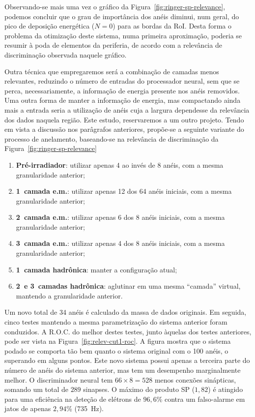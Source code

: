 Observando-se mais uma vez o gráfico da Figura~\ref{fig:ringer-sp-relevance},
podemos concluir que o grau de importância dos anéis diminui, num geral, do
pico de deposição energética ($N = 0$) para as bordas da RoI. Desta forma o
problema da otimização deste sistema, numa primeira aproximação, poderia se
resumir à poda de elementos da periferia, de acordo com a relevância de
discriminação observada naquele gráfico.

Outra técnica que empregaremos será a combinação de camadas menos relevantes,
reduzindo o número de entradas do processador neural, sem que se perca,
necessariamente, a informação de energia presente nos anéis removidos. Uma
outra forma de manter a informação de energia, mas compactando ainda mais a
entrada seria a utilização de anéis cuja a largura dependesse da relevância
dos dados naquela região. Este estudo, reservaremos a um outro projeto. Tendo
em vista a discussão nos parâgrafos anteriores, propõe-se a seguinte variante
do processo de anelamento, baseando-se na relevância de discriminação da
Figura~\ref{fig:ringer-sp-relevance}

\begin{enumerate}
\item \textbf{Pré-irradiador}: utilizar apenas 4 ao invés de 8 anéis, com a
mesma granularidade anterior;
\item \textbf{1\eira\ camada e.m.}: utilizar apenas 12 dos 64 anéis iniciais, com a
mesma granularidade anterior;
\item \textbf{2\eira\ camada e.m.}: utilizar apenas 6 dos 8 anéis iniciais, com a
mesma granularidade anterior;
\item \textbf{3\eira\ camada e.m.}: utilizar apenas 4 dos 8 anéis iniciais, com a
mesma granularidade anterior;
\item \textbf{1\eira\ camada hadrônica}: manter a configuração atual;
\item \textbf{2\eira\ e 3\eira\ camadas hadrônica}: aglutinar em uma mesma
``camada'' virtual, mantendo a granularidade anterior.
\end{enumerate} 

Um novo total de 34 anéis é calculado da massa de dados originais. Em seguida,
cinco testes mantendo a mesma parametrização do sistema anterior foram
conduzidos. A R.O.C. do melhor destes testes, junto àquelas dos testes
anteriores, pode ser vista na Figura~\ref{fig:relev-cut1-roc}. A figura mostra
que o sistema podado se comporta tão bem quanto o sistema original com o 100
anéis, o superando em alguns pontos. Este novo sistema possui apenas a
terceira parte do número de anéis do sistema anterior, mas tem um desempenho
marginalmente melhor. O discriminador neural tem $66 \times 8 = 528$ menos
conexões sinápticas, somando um total de $289$ sinapses. O máximo do produto
SP ($1,82$) é atingido para uma eficiência na deteção de elétrons de $96,6$\%
contra um falso-alarme em jatos de apenas $2,94$\% (735~Hz).

